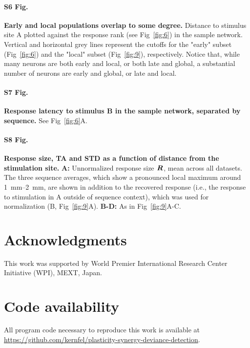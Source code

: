\documentclass[10pt,letterpaper]{article}
\newcommand{\dev}{\textit{A-as-dev}}
\newcommand{\msc}{\textit{A-in-con}}
\newcommand{\std}{\textit{A-as-std}}
\newcommand{\ifstringequal}[4]{%
  \ifnum\pdfstrcmp{#1}{#2}=0
  #3%
  \else
  #4%
  \fi
}
\newcommand{\seqreplace}[1]{\ifstringequal{dev}{#1}{\dev}{%
    \ifstringequal{std}{#1}{\std}{%
        \ifstringequal{msc}{#1}{\msc}{#1}%
    }%
}}
\newcommand{\R}[3][]{{}^{\seqreplace{#1}}_{}\boldsymbol R^{#2}_{#3}}
\newcommand{\FIG}[1]{Fig~\ref{fig:#1}}
\begin{document}
\paragraph*{S6 Fig.}
\label{S6_Fig}
\textbf{Early and local populations overlap to some degree.}
Distance to stimulus site A plotted against the response rank (see \FIG{6}) in the sample network. Vertical and horizontal grey lines represent the cutoffs for the "early" subset (\FIG{6}) and the "local" subset (\FIG{9}), respectively. Notice that, while many neurons are both early and local, or both late and global, a substantial number of neurons are early and global, or late and local.

\paragraph*{S7 Fig.}
\label{S7_Fig}
\textbf{Response latency to stimulus B in the sample network, separated by sequence.}
See \FIG{6}A.

\paragraph*{S8 Fig.}
\label{S8_Fig}
\textbf{Response size, TA and STD as a function of distance from the stimulation site.}
\textbf{A:} Unnormalized response size $\R{}{}$, mean across all datasets. The three sequence averages, which show a pronounced local maximum around \qtyrange{1}{2}{\milli\meter}, are shown in addition to the recovered response (i.e., the response to stimulation in A outside of sequence context), which was used for normalization (B, \FIG{9}A).
\textbf{B-D:} As in \FIG{9}A-C.

\section*{Acknowledgments}
This work was supported by World Premier International Research Center Initiative (WPI), MEXT, Japan.

\section*{Code availability}

All program code necessary to reproduce this work is available at \url{https://github.com/kernfel/plasticity-synergy-deviance-detection}.

\nolinenumbers
\end{document}
